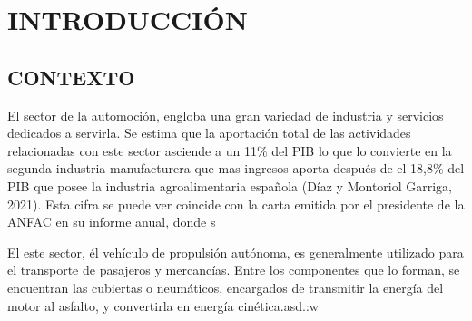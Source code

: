 \documentclass[12pt]{article}
\begin{document}
\begin{titlepage}
\begin{center}
\noindent{}
\end{center}

\hspace{-3.2cm}
\noindent{}
\end{titlepage}

\tableofcontents

\newpage 

\section{INTRODUCCIÓN}


\subsection{CONTEXTO}
El sector de la automoción, engloba una gran variedad de industria  y servicios dedicados a servirla. Se estima que la aportación total de las actividades relacionadas con este sector asciende a un 11\% del PIB lo que lo convierte en la segunda industria manufacturera que mas  ingresos aporta después de el 18,8\% del PIB que posee  la industria agroalimentaria española (Díaz y Montoriol Garriga, 2021). Esta cifra se puede ver coincide con la carta emitida por el presidente de la ANFAC en su informe anual, donde s

El  este sector, él vehículo de propulsión autónoma, es generalmente utilizado para el transporte de pasajeros y mercancías. Entre los componentes que lo forman, se encuentran las cubiertas o neumáticos, encargados de transmitir la energía del motor al asfalto, y convertirla en energía cinética.asd.:w
\end{document}
